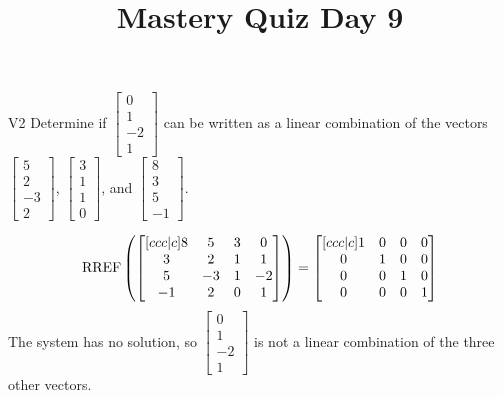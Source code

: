 \documentclass{sbgLAquiz}
\title{Mastery Quiz Day 9 }
\begin{document}
\begin{problem}{V2}
Determine if $\begin{bmatrix} 0 \\ 1 \\ -2 \\ 1 \end{bmatrix}$ can be written as a linear combination of the vectors $\begin{bmatrix} 5 \\ 2 \\ -3 \\ 2 \end{bmatrix}$, $\begin{bmatrix} 3 \\ 1 \\ 1 \\ 0 \end{bmatrix}$, and $\begin{bmatrix} 8 \\ 3 \\ 5 \\ -1 \end{bmatrix}$.
\end{problem}
\begin{solution}

$$\operatorname{RREF} \left(\begin{bmatrix}[ccc|c] 8 & 5 & 3 & 0\\ 3 & 2 & 1 & 1 \\ 5 & -3 & 1 & -2  \\ -1 & 2 & 0 & 1 \end{bmatrix} \right) = \begin{bmatrix}[ccc|c] 1 & 0 & 0 & 0  \\ 0 &  1 & 0 & 0  \\ 0 & 0 & 1 & 0 \\ 0 & 0 & 0 & 1  \end{bmatrix}$$
The system has no solution, so $\begin{bmatrix} 0 \\ 1 \\ -2 \\ 1 \end{bmatrix}$ is not a linear combination of the three other vectors.
\end{solution}
\end{document}
